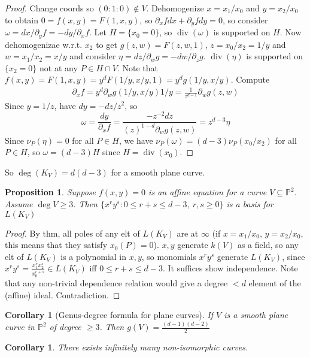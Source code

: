 \documentclass{article}
\theoremstyle{definition}
\theoremstyle{remark}
\theoremstyle{plain}
\newtheorem{prop}[defn]{Proposition}
\newtheorem{crly}[defn]{Corollary}
\newcommand{\PP}{\mathbb{P}}
\newcommand{\divi}{\operatorname{div}}
\begin{document}
\begin{proof}
    Change coords so $(0:1:0)\notin V$. Dehomogenize $x=x_1/x_0$ and $y=x_2/x_0$ to obtain $0=f(x,y)=F(1,x,y)$, so $\partial_x fdx+\partial_yfdy=0$, so consider $\omega=dx/\partial_yf=-dy/\partial_xf$. Let $H=\{x_0=0\}$, so $\divi(\omega)$ is supported on $H$. Now dehomogenizae w.r.t. $x_2$ to get $g(z,w)=F(z,w,1)$, $z=x_0/x_2=1/y$ and $w=x_1/x_2=x/y$ and consider $\eta=dz/\partial_wg=-dw/\partial_zg$. $\divi(\eta)$ is supported on $\{x_2=0\}$ not at any $P\in H\cap V$. Note that $f(x,y)=F(1,x,y)=y^dF(1/y,x/y,1)=y^dg(1/y,x/y)$. Compute
    \begin{align*}
        \partial_xf=y^d\partial_wg(1/y,x/y)1/y=\frac{1}{z^{d-1}}\partial_wg(z,w)
    \end{align*} Since $y=1/z$, have $dy=-dz/z^2$, so 
    \[\omega=\frac{dy}{\partial_xf}=\frac{-z^{-2}dz}{(z)^{1-d}\partial_wg(z,w)}=z^{d-3}\eta\] 
    Since $\nu_P(\eta)=0$ for all $P\in H$, we have $\nu_P(\omega)=(d-3)\nu_P(x_0/x_2)$ for all $P\in H$, so $\omega=(d-3)H$ since $H=\divi(x_0)$.
\end{proof}
So $\deg(K_V)=d(d-3)$ for a smooth plane curve.
\begin{prop}
    Suppose $f(x,y)=0$ is an affine equation for a curve $V\subseteq\PP^2$. Assume $\deg V\ge3$. Then $\{x^ry^s:0\le r+s\le d-3,\ r,s\ge 0\}$ is a basis for $L(K_V)$
\end{prop}
\begin{proof}
    By thm, all poles of any elt of $L(K_V)$ are at $\infty$ (if $x=x_1/x_0$, $y=x_2/x_0$, this means that they satisfy $x_0(P)=0$). $x,y$ generate $k(V)$ as a field, so any elt of $L(K_V)$ is a polynomial in $x,y$, so monomials $x^ry^s$ generate $L(K_V)$, since $x^ry^s=\frac{x_1^rx_2^s}{x_0^{r+s}}\in L(K_V)$ iff $0\le r+s\le d-3$. It suffices show independence. Note that any non-trivial dependence relation would give a degree $<d$ element of the (affine) ideal. Contradiction.
\end{proof}
\begin{crly}[Genus-degree formula for plane curves]
    If $V$ is a smooth plane curve in $\PP^2$ of degree $\ge3$. Then $g(V)=\frac{(d-1)(d-2)}{2}$
\end{crly}
\begin{crly}
    There exists infinitely many non-isomorphic curves.
\end{crly}
\end{document}
